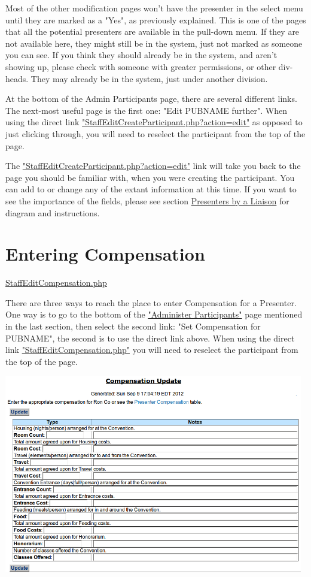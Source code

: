 \documentclass[captions=tablesignature]{scrartcl}
\begin{document}
Most of the other modification pages won't have the presenter in the
select menu until they are marked as a "Yes", as previously
explained.  This is one of the pages that all the potential
presenters are available in the pull-down menu.  If they are not
available here, they might still be in the system, just not marked
as someone you can see.  If you think they should already be in the
system, and aren't showing up, please check with someone with
greater permissions, or other div-heads.  They may already be in the
system, just under another division.

At the bottom of the Admin Participants page, there are several
different links.  The next-most useful page is the first one: "Edit
PUBNAME further". When using the direct link
\href{../webpages/StaffEditCreateParticipant.php?action=edit}{"StaffEditCreateParticipant.php?action=edit"} as opposed to just
clicking through, you will need to reselect the participant from the
top of the page.

The \href{../webpages/StaffEditCreateParticipant.php?action=edit}{"StaffEditCreateParticipant.php?action=edit"} link will take you
back to the page you should be familiar with, when you were creating
the participant.  You can add to or change any of the extant
information at this time.  If you want to see the importance of the
fields, please see section \hyperref[sec-2-3]{Presenters by a Liaison} for diagram and
instructions.
\section{Entering Compensation}
\label{sec-4}
\href{../webpages/StaffEditCompensation.php}{StaffEditCompensation.php}

There are three ways to reach the place to enter Compensation for a
Presenter.  One way is to go to the bottom of the
\href{../webpages/AdminParticipants.php}{"Administer Participants"} page mentioned in the last section, then
select the second link: "Set Compensation for PUBNAME", the second
is to use the direct link above.  When using the direct link
\href{../webpages/StaffEditCompensation.php}{"StaffEditCompensation.php"} you will need to reselect the
participant from the top of the page.

\includegraphics[width=0.98\textwidth]{./Images/Compensation_Update.png}
\end{document}
